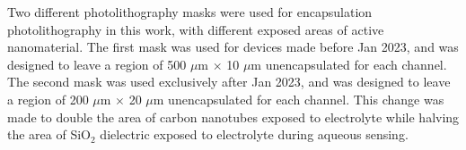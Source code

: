 \documentclass[
  letterpaper,
  DIV=11,
  numbers=noendperiod]{scrartcl}
\begin{document}
Two different photolithography masks were used for encapsulation
photolithography in this work, with different exposed areas of active
nanomaterial. The first mask was used for devices made before Jan 2023,
and was designed to leave a region of 500 \(\mu\)m \(\times\) 10
\(\mu\)m unencapsulated for each channel. The second mask was used
exclusively after Jan 2023, and was designed to leave a region of 200
\(\mu\)m \(\times\) 20 \(\mu\)m unencapsulated for each channel. This
change was made to double the area of carbon nanotubes exposed to
electrolyte while halving the area of SiO\(_2\) dielectric exposed to
electrolyte during aqueous sensing.

\begin{figure}

\begin{minipage}[t]{0.47\linewidth}

{\centering 


}

\end{minipage}%
%
\begin{minipage}[t]{0.05\linewidth}

{\centering 

~

}

\end{minipage}%
%
\begin{minipage}[t]{0.47\linewidth}

{\centering 

\raisebox{-\height}{

}}
\end{minipage}
\end{figure}
\end{document}
